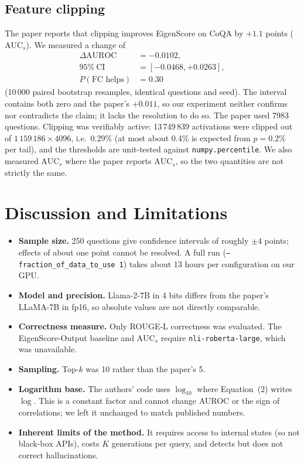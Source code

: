 \documentclass[conference]{IEEEtran}
\begin{document}
\subsection{Feature clipping}
The paper reports that clipping improves EigenScore on CoQA by $+1.1$ points ($\mathrm{AUC}_s$). We measured a change of
\begin{equation*}
\begin{aligned}\Delta\mathrm{AUROC}&=-0.0102,\\ 95\%\ \mathrm{CI}&=[-0.0468,+0.0263],\\ P(\text{FC helps})&=0.30\end{aligned}
\end{equation*}
(10\,000 paired bootstrap resamples, identical questions and seed). The interval contains both zero and the paper's $+0.011$, so our experiment neither confirms nor contradicts the claim; it lacks the resolution to do so. The paper used 7983 questions. Clipping was verifiably active: 13\,749\,839 activations were clipped out of $1\,159\,186\times4096$, i.e.\ 0.29\% (at most about 0.4\% is expected from $p=0.2\%$ per tail), and the thresholds are unit-tested against \texttt{numpy.percentile}. We also measured $\mathrm{AUC}_r$ where the paper reports $\mathrm{AUC}_s$, so the two quantities are not strictly the same.

\section{Discussion and Limitations}
\begin{itemize}
  \item \textbf{Sample size.} 250 questions give confidence intervals of roughly $\pm4$ points; effects of about one point cannot be resolved. A full run (\texttt{--fraction\_of\_data\_to\_use 1}) takes about 13 hours per configuration on our GPU.
  \item \textbf{Model and precision.} Llama-2-7B in 4 bits differs from the paper's LLaMA-7B in fp16, so absolute values are not directly comparable.
  \item \textbf{Correctness measure.} Only ROUGE-L correctness was evaluated. The EigenScore-Output baseline and $\mathrm{AUC}_s$ require \texttt{nli-roberta-large}, which was unavailable.
  \item \textbf{Sampling.} Top-$k$ was 10 rather than the paper's 5.
  \item \textbf{Logarithm base.} The authors' code uses $\log_{10}$ where Equation~(2) writes $\log$. This is a constant factor and cannot change AUROC or the sign of correlations; we left it unchanged to match published numbers.
  \item \textbf{Inherent limits of the method.} It requires access to internal states (so not black-box APIs), costs $K$ generations per query, and detects but does not correct hallucinations.
\end{itemize}
\end{document}
